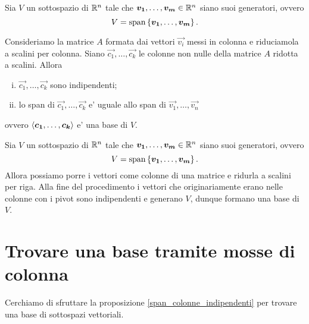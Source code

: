\begin{proposition} \label{span_colonne_indipendenti}

    Sia $V$ un sottospazio di $\mathbb{R}^n$ tale che $\bm{v_1}, \dots, \bm{v_m} \in \mathbb{R}^n$ siano suoi generatori, ovvero \[
        V = \operatorname{span}\left\{\bm{v_1}, \dots, \bm{v_m}\right\}.
    \] 
    
    Consideriamo la matrice $A$ formata dai vettori $\vec{v_i}$ messi in colonna e riduciamola a scalini per colonna.
    Siano $\vec{c_1}, \dots, \vec{c_k}$ le colonne non nulle della matrice $A$ ridotta a scalini. Allora \begin{enumerate}[(i)]
        \item $\vec{c_1}, \dots, \vec{c_k}$ sono indipendenti;
        \item lo span di $\vec{c_1}, \dots, \vec{c_k}$ e' uguale allo span di $\vec{v_1}, \dots, \vec{v_n}$
    \end{enumerate}
    ovvero $\left\langle \bm{c_1}, \dots, \bm{c_k} \right\rangle$ e' una base di $V$.
\end{proposition}

\begin{proposition}\label{estrarre_una_base}
    Sia $V$ un sottospazio di $\mathbb{R}^n$ tale che $\bm{v_1}, \dots, \bm{v_m} \in \mathbb{R}^n$ siano suoi generatori, ovvero \[
        V = \operatorname{span}\left\{\bm{v_1}, \dots, \bm{v_m}\right\}.  
    \] 
    Allora possiamo porre i vettori come colonne di una matrice e ridurla a scalini per riga. Alla fine del procedimento i vettori che originariamente erano nelle colonne con i pivot sono indipendenti e generano $V$, dunque formano una base di $V$.
\end{proposition}

\section{Trovare una base tramite mosse di colonna}

Cerchiamo di sfruttare la proposizione \ref{span_colonne_indipendenti} per trovare una base di sottospazi vettoriali.

